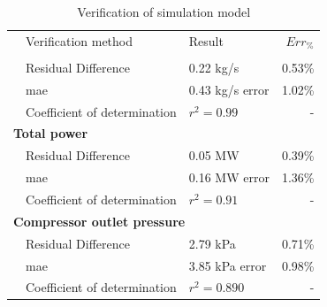 \begin{table}[h!]

	\caption{Verification of simulation model}
	\centering
	\begin{tabular}{p{0.5cm}p{8cm}p{5cm}r}
		\hline
		&Verification method & Result & $Err_{\%}$\\
		\hhline{====}
		 \multicolumn{4}{l}{\textbf{ Total Flow}}\\
		&Residual Difference  & 0.22 kg/s & 0.53\% \\
		&\gls{mae} 					 & 0.43 kg/s error & 1.02\% \\
		&Coefficient of determination & $r^2 =0.99$ & -\\ 
		 \multicolumn{4}{l}{\textbf{ Total power}}\\
		&Residual Difference  & 0.05 MW & 0.39\% \\
		&\gls{mae} 					 & 0.16 MW error & 1.36\% \\
		&Coefficient of determination & $r^2 =0.91$ & -\\ 
		 \multicolumn{4}{l}{\textbf{ Compressor outlet pressure}}\\
		&Residual Difference  & 2.79 kPa & 0.71\% \\
		&\gls{mae} 					 & 3.85 kPa error & 0.98\% \\
		&Coefficient of determination & $r^2 =0.890$ & -\\
		 	\hline
	\end{tabular} 
	
	\label{Kus verification table}
\end{table}
